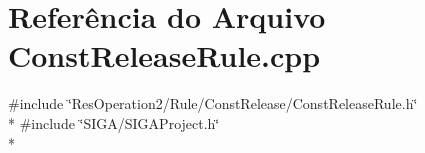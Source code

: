 \section{Referência do Arquivo Const\+Release\+Rule.\+cpp}
\label{_2_rule_2_const_release_2_const_release_rule_8cpp}
{\ttfamily \#include \char`\"{}Res\+Operation2/\+Rule/\+Const\+Release/\+Const\+Release\+Rule.\+h\char`\"{}}\\*
{\ttfamily \#include \char`\"{}S\+I\+G\+A/\+S\+I\+G\+A\+Project.\+h\char`\"{}}\\*
